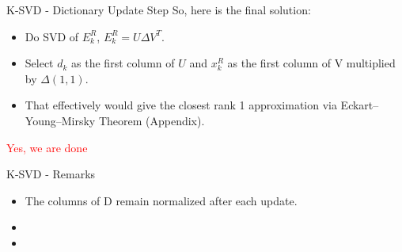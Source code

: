 \documentclass{beamer}
\begin{document}
\begin{frame}{K-SVD - Dictionary Update Step}
So, here is the final solution:
\begin{itemize}
    \item Do SVD of $E_k^R$, $E_k^R = U \Delta V^T$.
    \item Select $d_k$ as the first column of $U$ and $x_k^R$ as the first column of V multiplied by $\Delta(1,1)$.
    \item That effectively would give the closest rank 1 approximation via Eckart–Young–Mirsky Theorem (Appendix).
\end{itemize}

\textcolor{red}{Yes, we are done}
\end{frame}

\begin{frame}{K-SVD - Remarks}
\begin{itemize}
    \item The columns of D remain normalized after each update.
    \item[] \phantom{The support of all the columns of $X$ stays either same or gets smaller after each update.}
    \item[] \phantom{There is simultaneous update of both the $X$ and $D$ in the dictionary update step. Consider two cases, one without simultaneous update and other with simultaneous update.}
\end{itemize}
\[
\phantom{\hat{X}^{\,\mathrm{wsu}} = \hat{X}, 
\hat{D}^{\,\mathrm{wsu}} = \arg\min_{D} J(D,\hat{X})
\quad
\text{s.t. } \|d_j\|_2 = 1 \text{ for all } j}
\]
\[
\phantom{\hat{D}^{\,\mathrm{su}}, \hat{X}^{\,\mathrm{su}}
=
\arg\min_{D,X} J(D,X)
\quad
\text{s.t. } \|d_j\|_2 = 1 \text{ for all } j,\;
\operatorname{supp}(X) \subseteq \Omega}
\]
\[
\phantom{J(\hat{D}^{\,\mathrm{su}}, \hat{X}^{\,\mathrm{su}}) \leq J(\hat{D}^{\,\mathrm{wsu}}, \hat{X}^{\,\mathrm{wsu}})}
\]
\phantom{Case 1 has lesser search space and Case 2. So case 2 is likely to end up in a lesser minima than case 1.}
\end{frame}
\end{document}
